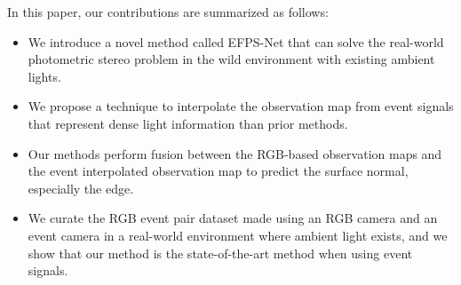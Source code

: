 In this paper, our contributions are summarized as follows:
\begin{itemize}
    \item We introduce a novel method called EFPS-Net that can solve the real-world photometric stereo problem in the wild environment with existing ambient lights. 
    \item We propose a technique to interpolate the observation map from event signals that represent dense light information than prior methods.
    \item Our methods perform fusion between the RGB-based observation maps and the event interpolated observation map to predict the surface normal, especially the edge.
    \item We curate the RGB event pair dataset made using an RGB camera and an event camera in a real-world environment where ambient light exists, and we show that our method is the state-of-the-art method when using event signals.
\end{itemize}